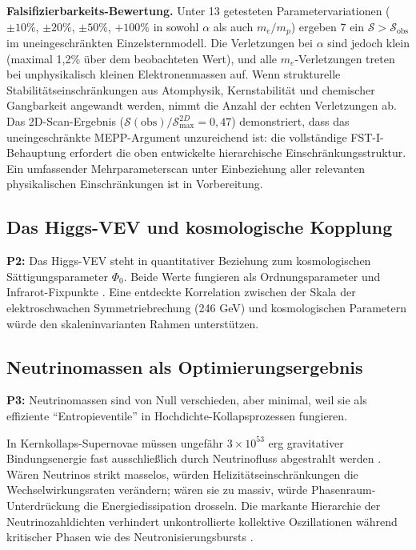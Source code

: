 \documentclass[12pt,a4paper]{article}
\theoremstyle{remark}
\begin{document}
\textbf{Falsifizierbarkeits-Bewertung.} Unter 13 getesteten Parametervariationen ($\pm 10\%$, $\pm 20\%$, $\pm 50\%$, $+100\%$ in sowohl $\alpha$ als auch $m_e/m_p$) ergeben 7 ein $\mathcal{S} > \mathcal{S}_{\text{obs}}$ im uneingeschr\"ankten Einzelsternmodell. Die Verletzungen bei $\alpha$ sind jedoch klein (maximal 1{,}2\% \"uber dem beobachteten Wert), und alle $m_e$-Verletzungen treten bei unphysikalisch kleinen Elektronenmassen auf. Wenn strukturelle Stabilit\"atseinschr\"ankungen aus Atomphysik, Kernstabilit\"at und chemischer Gangbarkeit angewandt werden, nimmt die Anzahl der echten Verletzungen ab. Das 2D-Scan-Ergebnis ($\mathcal{S}(\text{obs})/\mathcal{S}_{\text{max}}^{2D} = 0{,}47$) demonstriert, dass das uneingeschr\"ankte MEPP-Argument unzureichend ist: die vollst\"andige FST-I-Behauptung erfordert die oben entwickelte hierarchische Einschr\"ankungsstruktur. Ein umfassender Mehrparameterscan unter Einbeziehung aller relevanten physikalischen Einschr\"ankungen ist in Vorbereitung.

\subsection{Das Higgs-VEV und kosmologische Kopplung}

\textbf{P2:} Das Higgs-VEV steht in quantitativer Beziehung zum kosmologischen S\"attigungsparameter $\Phi_0$. Beide Werte fungieren als Ordnungsparameter und Infrarot-Fixpunkte \citep{HiggsVEV2024}. Eine entdeckte Korrelation zwischen der Skala der elektroschwachen Symmetriebrechung (246 GeV) und kosmologischen Parametern w\"urde den skaleninvarianten Rahmen unterst\"utzen.

\subsection{Neutrinomassen als Optimierungsergebnis}

\textbf{P3:} Neutrinomassen sind von Null verschieden, aber minimal, weil sie als effiziente ``Entropieventile'' in Hochdichte-Kollapsprozessen fungieren.

In Kernkollaps-Supernovae m\"ussen ungef\"ahr $3 \times 10^{53}$ erg gravitativer Bindungsenergie fast ausschlie\ss{}lich durch Neutrinofluss abgestrahlt werden \citep{SupernovaNeutrinos,SupernovaSimulations}. W\"aren Neutrinos strikt masselos, w\"urden Helizit\"atseinschr\"ankungen die Wechselwirkungsraten ver\"andern; w\"aren sie zu massiv, w\"urde Phasenraum-Unterdr\"uckung die Energiedissipation drosseln. Die markante Hierarchie der Neutrinozahldichten verhindert unkontrollierte kollektive Oszillationen w\"ahrend kritischer Phasen wie des Neutronisierungsbursts \citep{NeutrinoOscillations}.
\end{document}

